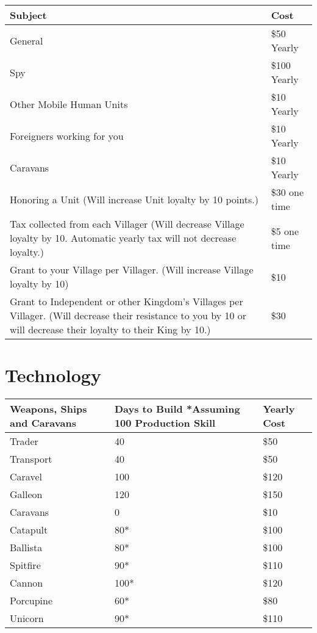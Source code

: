 \begin{tabular}{ | p{5cm} | p{5cm} |}
	\hline
	Subject	& Cost \\ \hline
General	& \$50 Yearly \\ \hline
Spy	& \$100 Yearly \\ \hline
Other Mobile Human Units	& \$10 Yearly \\ \hline
Foreigners working for you	& \$10 Yearly \\ \hline
Caravans	& \$10 Yearly \\ \hline
Honoring a Unit (Will increase Unit loyalty by 10 points.)	& \$30 one time \\ \hline
Tax collected from each Villager (Will decrease Village loyalty by 10. Automatic yearly tax will not decrease loyalty.)	& \$5 one time \\ \hline
Grant to your Village per Villager. (Will increase Village loyalty by 10)	& \$10 \\ \hline 
Grant to Independent or other Kingdom’s Villages per Villager. (Will decrease their resistance to you by 10 or will decrease their loyalty to their King by 10.)	& \$30 \\ \hline 
\hline
\end{tabular}

\section{Technology}

\begin{tabular}{ | p{4cm} | p{4cm} | p{4cm} |}
	\hline
	Weapons, Ships and Caravans	&  Days to Build *Assuming 100 Production Skill & Yearly Cost \\ \hline
Trader	& 40 & \$50 \\ \hline
Transport	& 40 & \$50 \\ \hline
Caravel	& 100 & \$120 \\ \hline
Galleon	& 120 & \$150 \\ \hline
Caravans	& 0 & \$10 \\ \hline
Catapult	& 80* & \$100 \\ \hline
Ballista	& 80* & \$100 \\ \hline
Spitfire	& 90* & \$110 \\ \hline 
Cannon	& 100* & \$120 \\ \hline 
Porcupine	& 60* & \$80 \\ \hline 
Unicorn	& 90* & \$110 \\ \hline 
\hline
\end{tabular}

